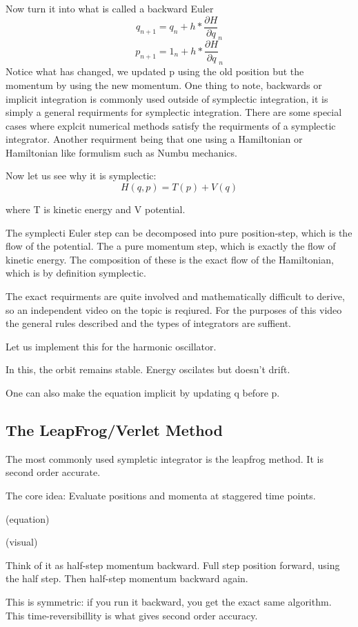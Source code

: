 Now turn it into what is called a backward Euler
\[
	q_{n+1} = q_n + h * \frac{\partial H}{\partial q}_n
\]
\[
	p_{n+1}=1_n +h * \frac{\partial H}{\partial q}_n
\]
Notice what has changed, we updated p using the old position but the momentum by using the new momentum. One thing to note, backwards or implicit integration is commonly used outside of symplectic integration, it is simply a general requirments for symplectic integration. There are some special cases where explcit numerical methods satisfy the requirments of a symplectic integrator. Another requirment being that one using a Hamiltonian or Hamiltonian like formulism such as Numbu mechanics.

Now let us see why it is symplectic:
\[
	H(q,p) = T(p) + V(q)
\]

where T is kinetic energy and V potential.

The symplecti Euler step can be decomposed into pure position-step, which is the flow of the potential. The a pure momentum step, which is exactly the flow of kinetic energy. The composition of these is the exact flow of the Hamiltonian, which is by definition symplectic.

The exact requirments are quite involved and mathematically difficult to derive, so an independent video on the topic is reqiured. For the purposes of this video the general rules described and the types of integrators are suffient.

Let us implement this for the harmonic oscillator.

In this, the orbit remains stable. Energy oscilates but doesn't drift.

One can also make the equation implicit by updating q before p.

\subsection{The LeapFrog/Verlet Method}

The most commonly used sympletic integrator is the leapfrog method. It is second order accurate.

The core idea: Evaluate positions and momenta at staggered time points.

(equation)

(visual)

Think of it as half-step momentum backward. Full step position forward, using the half step. Then half-step momentum backward again.

This is symmetric: if you run it backward, you get the exact same algorithm. This time-reversibillity is what gives second order accuracy.

